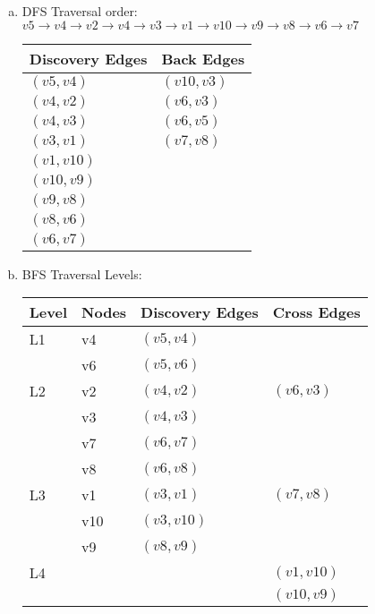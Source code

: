 \documentclass[fleqn, 12pt]{article}
\begin{document}
\begin{enumerate}[a)]
\item
    DFS Traversal order: $v5 \rightarrow v4 \rightarrow v2 \rightarrow v4 \rightarrow v3 \rightarrow v1 \rightarrow v10 \rightarrow v9 \rightarrow v8 \rightarrow v6 \rightarrow v7$
    
    \begin{center}
        \begin{tabular}{ | l | l |}
            \hline
            Discovery Edges & Back Edges \\ \hline
            $(v5,v4)$ & $(v10,v3)$ \\ \hline
            $(v4,v2)$ & $(v6,v3)$ \\ \hline
            $(v4,v3)$ & $(v6,v5)$ \\ \hline
            $(v3,v1)$ & $(v7,v8)$ \\ \hline
            $(v1,v10)$ & \\ \hline
            $(v10,v9)$ & \\ \hline
            $(v9,v8)$ & \\ \hline
            $(v8,v6)$ & \\ \hline
            $(v6,v7)$ & \\
            \hline
        \end{tabular}
    \end{center}
    
\item
    BFS Traversal Levels:

    \begin{center}
        \begin{tabular}{ | l | l | l | l | }
            \hline
            Level & Nodes & Discovery Edges & Cross Edges \\ \hline
            L1 & v4 & $(v5,v4)$ & \\ \cline{2-4}
            & v6 & $(v5,v6)$ & \\ \hline
            L2 & v2 & $(v4,v2)$ & $(v6, v3)$ \\ \cline{2-4}
            & v3 & $(v4,v3)$ & \\ \cline{2-4}
            & v7 & $(v6,v7)$ & \\ \cline{2-4}
            & v8 & $(v6,v8)$ & \\ \hline
            L3 & v1 & $(v3,v1)$ & $(v7, v8)$ \\ \cline{2-4}
            & v10 & $(v3,v10)$ & \\ \cline{2-4}
            & v9 & $(v8,v9)$ & \\ \hline
            L4 & & & $(v1,v10)$ \\ \cline{2-4}
            & & & $(v10,v9)$ \\
            \hline
        \end{tabular}
    \end{center}

\end{enumerate}
\end{document}

